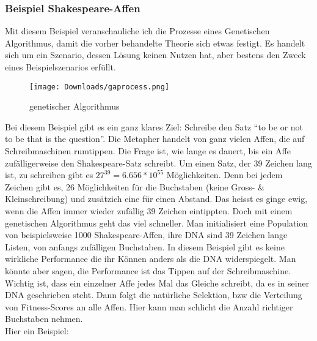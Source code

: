 \documentclass[11pt,a4paper,ngerman]{article}
\begin{document}
\subsubsection{Beispiel Shakespeare-Affen}

Mit diesem Beispiel veranschauliche ich die Prozesse eines Genetischen Algorithmus, damit die vorher behandelte Theorie sich etwas festigt. Es handelt sich um ein Szenario, dessen Lösung keinen Nutzen hat, aber bestens den Zweck eines Beispielszenarios erfüllt.\\

\begin{wrapfigure}[20]{l}{0.3\textwidth} 
    \vspace{-20pt}
        \begin{center}
            \texttt{[image: Downloads/gaprocess.png]}
            \caption{genetischer Algorithmus}
        \end{center}
    \vspace{-20pt}
\end{wrapfigure} 

Bei diesem Beispiel gibt es ein ganz klares Ziel: Schreibe den Satz \enquote{to be or not to be that is the question}. Die Metapher handelt von ganz vielen Affen, die auf Schreibmaschinen rumtippen. Die Frage ist, wie lange es dauert, bis ein Affe zufälligerweise den Shakespeare-Satz schreibt. Um einen Satz, der 39 Zeichen lang ist, zu schreiben gibt es $ 27^{39} = 6.656* 10^{55}$ Möglichkeiten. Denn bei jedem Zeichen gibt es, 26 Möglichkeiten für die Buchstaben (keine Gross- \& Kleinschreibung) und zusätzich eine für einen Abstand. Das heisst es ginge ewig, wenn die Affen immer wieder zufällig 39 Zeichen eintippten. Doch mit einem genetischen Algorithmus geht das viel schneller. Man initialisiert eine Population von beispielsweise 1000 Shakespeare-Affen, ihre DNA sind 39 Zeichen lange Listen, von anfangs zufälligen Buchstaben. In diesem Beispiel gibt es keine wirkliche Performance die ihr Können anders als die DNA widerspiegelt. Man könnte aber sagen, die Performance ist das Tippen auf der Schreibmaschine. Wichtig ist, dass ein einzelner Affe jedes Mal das Gleiche schreibt, da es in seiner DNA geschrieben steht. Dann folgt die natürliche Selektion, bzw die Verteilung von Fitness-Scores an alle Affen. Hier kann man schlicht die Anzahl richtiger Buchstaben nehmen.\\

Hier ein Beispiel:\\
\end{document}
